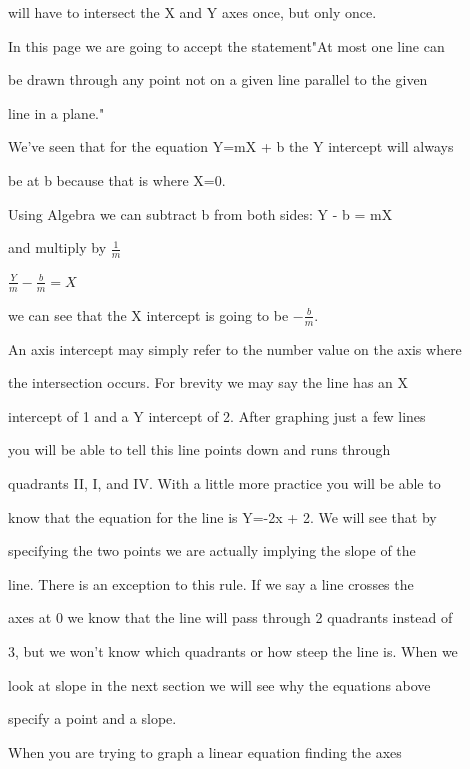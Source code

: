 will have to intersect the X and Y axes once, but only once.



In this page we are going to accept the statement"At most one line can

be drawn through any point not on a given line parallel to the given

line in a plane."



We've seen that for the equation Y=mX + b the Y intercept will always

be at b because that is where X=0.



Using Algebra we can subtract b from both sides: Y - b = mX



and multiply by $\frac {1}{m}$



$\frac {Y}{m} - \frac {b}{m} = X$



we can see that the X intercept is going to be $-\frac{b}{m}$.



An axis intercept may simply refer to the number value on the axis where

the intersection occurs. For brevity we may say the line has an X

intercept of 1 and a Y intercept of 2. After graphing just a few lines

you will be able to tell this line points down and runs through

quadrants II, I, and IV. With a little more practice you will be able to

know that the equation for the line is Y=-2x + 2. We will see that by

specifying the two points we are actually implying the slope of the

line. There is an exception to this rule. If we say a line crosses the

axes at 0 we know that the line will pass through 2 quadrants instead of

3, but we won't know which quadrants or how steep the line is. When we

look at slope in the next section we will see why the equations above

specify a point and a slope.



When you are trying to graph a linear equation finding the axes


